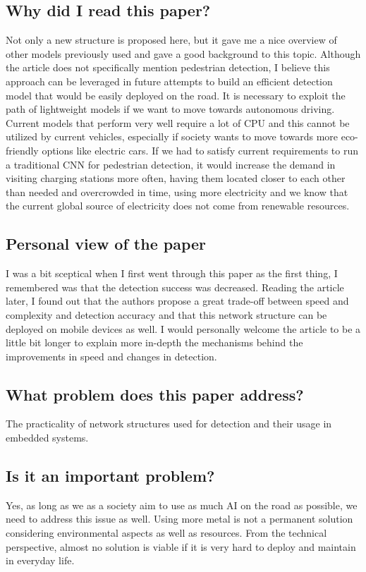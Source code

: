 \documentclass[11pt,a4paper]{article}
\begin{document}
\subsection*{Why did I read this paper?}
Not only a new structure is proposed here, but it gave me a nice overview of other models previously used and gave a good background to this topic. Although the article does not specifically mention pedestrian detection, I believe this approach can be leveraged in future attempts to build an efficient detection model that would be easily deployed on the road. It is necessary to exploit the path of lightweight models if we want to move towards autonomous driving. Current models that perform very well require a lot of CPU and this cannot be utilized by current vehicles, especially if society wants to move towards more eco-friendly options like electric cars. If we had to satisfy current requirements to run a traditional CNN for pedestrian detection, it would increase the demand in visiting charging stations more often, having them located closer to each other than needed and overcrowded in time, using more electricity and we know that the current global source of electricity does not come from renewable resources.

\subsection*{Personal view of the paper}
I was a bit sceptical when I first went through this paper as the first thing, I remembered was that the detection success was decreased. Reading the article later, I found out that the authors propose a great trade-off between speed and complexity and detection accuracy and that this network structure can be deployed on mobile devices as well. I would personally welcome the article to be a little bit longer to explain more in-depth the mechanisms behind the improvements in speed and changes in detection.

\subsection*{What problem does this paper address?}
The practicality of network structures used for detection and their usage in embedded systems.

\subsection*{Is it an important problem?}
Yes, as long as we as a society aim to use as much AI on the road as possible, we need to address this issue as well. Using more metal is not a permanent solution considering environmental aspects as well as resources. From the technical perspective, almost no solution is viable if it is very hard to deploy and maintain in everyday life.
\end{document}
